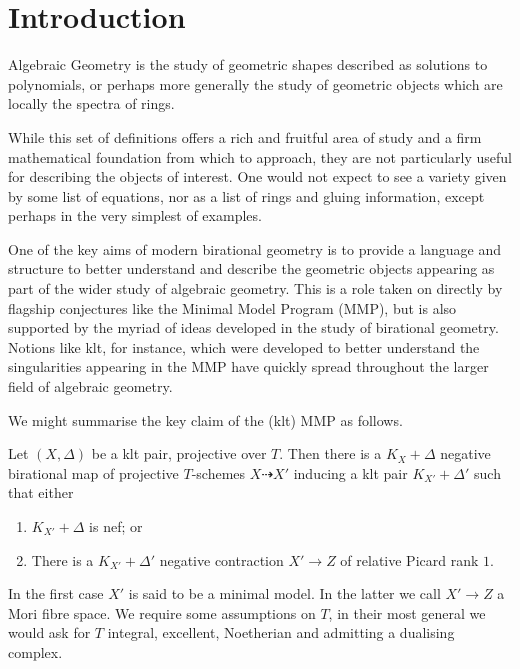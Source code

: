 \documentclass[a4paper,12pt]{book}
\begin{document}
	\chapter{Introduction}

	Algebraic Geometry is the study of geometric shapes described as solutions to polynomials, or perhaps more generally the study of geometric objects which are locally the spectra of rings.
	
	While this set of definitions offers a rich and fruitful area of study and a firm mathematical foundation from which to approach, they are not particularly useful for describing the objects of interest. One would not expect to see a variety given by some list of equations, nor as a list of rings and gluing information, except perhaps in the very simplest of examples.
	
	One of the key aims of modern birational geometry is to provide a language and structure to better understand and describe the geometric objects appearing as part of the wider study of algebraic geometry. This is a role taken on directly by flagship conjectures like the Minimal Model Program (MMP), but is also supported by the myriad of ideas developed in the study of birational geometry. Notions like klt, for instance, which were developed to better understand the singularities appearing in the MMP have quickly spread throughout the larger field of algebraic geometry.
	
	We might summarise the key claim of the (klt) MMP as follows.
	
	\begin{conjecture*}
		Let $(X,\Delta)$ be a klt pair, projective over $T$. Then there is a $K_{X}+\Delta$ negative birational map of projective $T$-schemes $X \dashrightarrow X'$ inducing a klt pair $K_{X'}+\Delta'$ such that either
		
		\begin{enumerate}
			\item $K_{X'}+\Delta$ is nef; or
			\item There is a $K_{X'}+\Delta'$ negative contraction $X' \to Z$ of relative Picard rank $1$.
		\end{enumerate}
	\end{conjecture*}
	
	In the first case $X'$ is said to be a minimal model. In the latter we call $X' \to Z$ a Mori fibre space. We require some assumptions on $T$, in their most general we would ask for $T$ integral, excellent, Noetherian and admitting a dualising complex.
	
\end{document}
